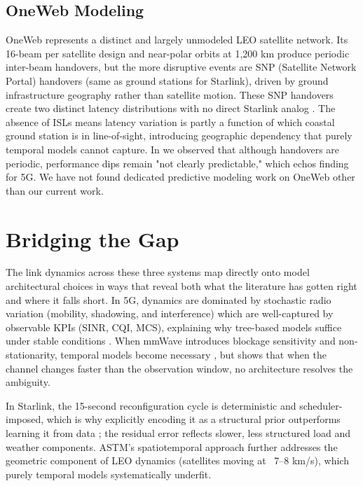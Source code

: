 \documentclass[12pt]{article}
\begin{document}
\subsection{OneWeb Modeling}

OneWeb represents a distinct and largely unmodeled LEO satellite network. Its 16-beam per satellite design and near-polar orbits at 1,200 km produce periodic inter-beam handovers, but the more disruptive events are SNP (Satellite Network Portal) handovers (same as ground stations for Starlink), driven by ground infrastructure geography rather than satellite motion. These SNP handovers create two distinct latency distributions with no direct Starlink analog \cite{zhao2025measuring, 11310330}. The absence of ISLs means latency variation is partly a function of which coastal ground station is in line-of-sight, introducing geographic dependency that purely temporal models cannot capture. In \cite{11310330} we observed that although handovers are periodic, performance dips remain "not clearly predictable," which echos \cite{10723472} finding for 5G. We have not found dedicated predictive modeling work on OneWeb other than our current work.
    
\section{Bridging the Gap}    

The link dynamics across these three systems map directly onto model architectural choices in ways that reveal both what the literature has gotten right and where it falls short. In 5G, dynamics are dominated by stochastic radio variation (mobility, shadowing, and interference) which are well-captured by observable KPIs (SINR, CQI, MCS), explaining why tree-based models suffice under stable conditions \cite{minovski2021throughput, lumos5g}. When mmWave introduces blockage sensitivity and non-stationarity, temporal models become necessary \cite{lumos5g, MEI2022108736}, but \cite{10723472} shows that when the channel changes faster than the observation window, no architecture resolves the ambiguity. 

In Starlink, the 15-second reconfiguration cycle is deterministic and scheduler-imposed, which is why explicitly encoding it as a structural prior outperforms learning it from data \cite{liu2025vivisecting}; the residual error reflects slower, less structured load and weather components. ASTM's spatiotemporal approach \cite{Tian2025attentionbased} further addresses the geometric component of LEO dynamics (satellites moving at ~7--8 km/s), which purely temporal models systematically underfit. 
\end{document}
